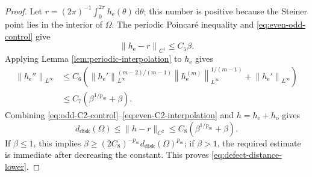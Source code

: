 \documentclass[10pt,a4paper]{amsart}
\begin{document}
\begin{proof}
Let $r=(2\pi)^{-1}\int_0^{2\pi}h_{\mathrm{e}}(\theta)\,\mathrm{d}\theta$; this number is
positive because the Steiner point lies in the interior of $\Omega$.
The periodic Poincar\'e inequality and \eqref{eq:even-odd-control} give
\begin{equation*}\label{eq:even-C1-control}
 \left\|h_{\mathrm{e}}-r\right\|_{C^1}\leq C_5\beta.
\end{equation*}
Applying Lemma \ref{lem:periodic-interpolation} to $h_{\mathrm{e}}$ gives
\begin{align}
 \left\|h_{\mathrm{e}}''\right\|_{L^\infty}
 &\leq C_6\left(
 \left\|h_{\mathrm{e}}'\right\|_{L^\infty}^{(m-2)/(m-1)}
 \left\|h_{\mathrm{e}}^{(m)}\right\|_{L^\infty}^{1/(m-1)}
 +\left\|h_{\mathrm{e}}'\right\|_{L^\infty}\right)\nonumber\\
 &\leq C_7\left(\beta^{1/p_m}+\beta\right).
 \label{eq:even-C2-interpolation}
\end{align}
Combining \eqref{eq:odd-C2-control}--\eqref{eq:even-C2-interpolation} and $h=h_{\mathrm{e}}+h_{\mathrm{o}}$ gives
\begin{equation*}\label{eq:distance-upper-by-defect}
 d_{\mathrm{disk}}(\Omega)
 \leq\|h-r\|_{C^2}
 \leq C_8\left(\beta^{1/p_m}+\beta\right).
\end{equation*}
If $\beta\leq1$, this implies
$\beta\geq\left(2C_8\right)^{-p_m}d_{\mathrm{disk}}(\Omega)^{p_m}$; if
$\beta>1$, the required estimate is immediate after decreasing the
constant. This proves \eqref{eq:defect-distance-lower}.
\end{proof}
\end{document}
